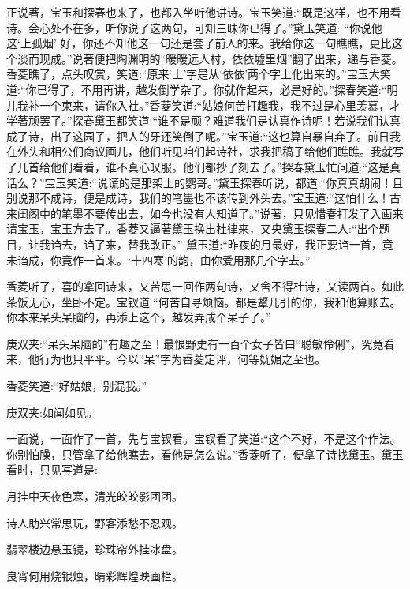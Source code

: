 \begin{parag}
    正说著，宝玉和探春也来了，也都入坐听他讲诗。宝玉笑道:“既是这样，也不用看诗。会心处不在多，听你说了这两句，可知三昧你已得了。”黛玉笑道: “你说他这‘上孤烟’ 好，你还不知他这一句还是套了前人的来。我给你这一句瞧瞧，更比这个淡而现成。”说著便把陶渊明的“暧暧远人村，依依墟里烟”翻了出来，递与香菱。香菱瞧了，点头叹赏，笑道:“原来‘上’字是从‘依依’两个字上化出来的。”宝玉大笑道:“你已得了，不用再讲，越发倒学杂了。你就作起来，必是好的。”探春笑道:“明儿我补一个柬来，请你入社。”香菱笑道:“姑娘何苦打趣我，我不过是心里羡慕，才学著顽罢了。”探春黛玉都笑道:“谁不是顽？难道我们是认真作诗呢！若说我们认真成了诗，出了这园子，把人的牙还笑倒了呢。”宝玉道:“这也算自暴自弃了。前日我在外头和相公们商议画儿，他们听见咱们起诗社，求我把稿子给他们瞧瞧。我就写了几首给他们看看，谁不真心叹服。他们都抄了刻去了。”探春黛玉忙问道:“这是真话么？”宝玉笑道:“说谎的是那架上的鹦哥。”黛玉探春听说，都道:“你真真胡闹！且别说那不成诗，便是成诗，我们的笔墨也不该传到外头去。”宝玉道:“这怕什么！古来闺阁中的笔墨不要传出去，如今也没有人知道了。”说著，只见惜春打发了入画来请宝玉，宝玉方去了。香菱又逼著黛玉换出杜律来，又央黛玉探春二人:“出个题目，让我诌去，诌了来，替我改正。” 黛玉道:“昨夜的月最好，我正要诌一首，竟未诌成，你竟作一首来。‘十四寒’的韵，由你爱用那几个字去。”
\end{parag}


\begin{parag}
    香菱听了，喜的拿回诗来，又苦思一回作两句诗，又舍不得杜诗，又读两首。如此茶饭无心，坐卧不定。宝钗道:“何苦自寻烦恼。都是颦儿引的你，我和他算账去。你本来呆头呆脑的，再添上这个，越发弄成个呆子了。”\begin{note}庚双夹:“呆头呆脑的”有趣之至！最恨野史有一百个女子皆曰“聪敏伶俐”，究竟看来，他行为也只平平。今以“呆”字为香菱定评，何等妩媚之至也。\end{note}香菱笑道:“好姑娘，别混我。”\begin{note}庚双夹:如闻如见。\end{note}一面说，一面作了一首，先与宝钗看。宝钗看了笑道:“这个不好，不是这个作法。你别怕臊，只管拿了给他瞧去，看他是怎么说。”香菱听了，便拿了诗找黛玉。黛玉看时，只见写道是:
\end{parag}


\begin{poem}
    \begin{pl}月挂中天夜色寒，清光皎皎影团团。\end{pl}

    \begin{pl}诗人助兴常思玩，野客添愁不忍观。\end{pl}

    \begin{pl}翡翠楼边悬玉镜，珍珠帘外挂冰盘。\end{pl}

    \begin{pl}良宵何用烧银烛，晴彩辉煌映画栏。\end{pl}
\end{poem}


